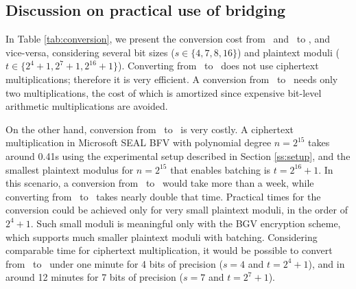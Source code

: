 \subsection{Discussion on practical use of bridging}\label{ss:discussion}

In Table \ref{tab:conversion}, we present the conversion cost from \secuint\ and \secint\ to \secmod, and vice-versa, considering several bit sizes ($s \in \{4, 7, 8, 16\}$) and plaintext moduli ($t \in \{2^4+1, 2^7+1, 2^{16}+1\}$).
Converting from \secuint\ to \secmod\ does not use ciphertext multiplications; therefore it is very efficient.
A conversion from \secint\ to \secmod\ needs only two multiplications, the cost of which is amortized since expensive bit-level arithmetic multiplications are avoided.

On the other hand, conversion from \secmod\ to \secuint\ is very costly.
A ciphertext multiplication in Microsoft SEAL BFV with polynomial degree $n = 2^{15}$ takes around 0.41s using the experimental setup described in Section \ref{ss:setup}, and the smallest plaintext modulus for $n = 2^{15}$ that enables batching is $t = 2^{16}+1$.
In this scenario, a conversion from \secmod\ to \secuint\ would take more than a week, while converting from \secmod\ to \secint\ takes nearly double that time.
Practical times for the conversion could be achieved only for very small plaintext moduli, in the order of $2^4+1$. Such small moduli is meaningful only with the BGV encryption scheme, which supports much smaller plaintext moduli with batching.
Considering comparable time for ciphertext multiplication, it would be possible to convert from \secmod\ to \secuint\ under one minute for 4 bits of precision ($s = 4$ and $t = 2^4+1$), and in around 12 minutes for 7 bits of precision ($s = 7$ and $t = 2^7+1$).

